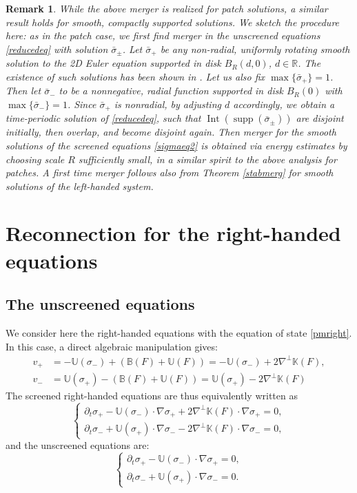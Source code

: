 \documentclass[11pt,reqno]{amsproc}
\newcommand{\pa}{\partial}
\newcommand{\la}{\label}
\newtheorem{rem}{Remark}
\newcommand{\R}{\mathbb{R}}
\newcommand{\B}{\mathbb{B}}
\newcommand{\U}{\mathbb{U}}
\DeclareMathOperator{\supp}{supp}
\DeclareMathOperator{\Int}{Int}
\begin{document}
\begin{rem}
    While the above merger is realized for patch solutions, a similar result holds for smooth, compactly supported solutions. We sketch the procedure here: as in the patch case, we first find merger in the unscreened equations \eqref{reducedeq} with solution $\bar\sigma_\pm$. Let $\bar\sigma_+$ be any non-radial, uniformly rotating smooth solution to the 2D Euler equation supported in disk $B_R(d,0)$, $d \in \R$. The existence of such solutions has been shown in \cite{desing1,desing2}. Let us also fix $\max\{\bar \sigma_+\} = 1$. Then let $\bar\sigma_-$ to be a nonnegative, radial function supported in disk $B_R(0)$ with $\max\{\bar\sigma_-\} = 1$. Since $\bar\sigma_+$ is nonradial, by adjusting $d$ accordingly, we obtain  a time-periodic solution of \eqref{reducedeq}, such that $\Int(\supp(\bar\sigma_\pm))$ are disjoint initially, then overlap, and become disjoint again. Then merger for the smooth solutions of the screened equations \eqref{sigmaeq2} is obtained via energy estimates by choosing scale $R$ sufficiently small, in a similar spirit to the above analysis for patches. A first time merger follows also from Theorem \ref{stabmerg} for smooth solutions of the left-handed system. 
\end{rem} 


\section{Reconnection for the right-handed equations}\la{recright}
\subsection{The unscreened equations}
We consider here the right-handed equations with the equation of state \eqref{pmright}. In this case, a direct algebraic manipulation gives:
\begin{align*}
    v_+ &= - \U(\sigma_-) + (\B(F) + \U(F)) = - \U(\sigma_-) + 2\nabla^\perp \mathbb K(F),\\
    v_- &=  \U(\sigma_+) - (\B(F) + \U(F)) =  \U(\sigma_+) - 2\nabla^\perp \mathbb K(F)
\end{align*}
The screened right-handed equations are thus equivalently written as
\begin{equation}\label{eq:fullsys}
\begin{cases}
    \pa_t \sigma_+ - \U(\sigma_-) \cdot \nabla \sigma_+ + 2\nabla^\perp \mathbb K(F)\cdot \nabla \sigma_+ = 0,\\
    \pa_t \sigma_- + \U(\sigma_+) \cdot \nabla \sigma_- - 2\nabla^\perp \mathbb K(F)\cdot \nabla \sigma_- = 0,
\end{cases}
\end{equation}
and the unscreened equations are:
\begin{equation}\label{eq:model2}
\begin{cases}
    \pa_t \sigma_+ - \U(\sigma_-) \cdot \nabla \sigma_+ = 0,\\
    \pa_t \sigma_- + \U(\sigma_+) \cdot \nabla \sigma_- = 0.
\end{cases}
\end{equation}
\end{document}
